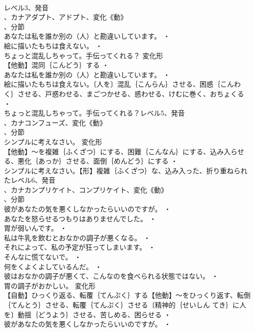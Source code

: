 \documentclass[8pt]{extreport}
\begin{document}
\begin{CJK}{UTF8}{min}
\\	レベル3、発音
\\	、カナアダプト、アドプト、変化《動》
\\	、分節
\\	あなたは私を誰か別の（人）と勘違いしています。 ・
\\	絵に描いたもちは食えない。 ・
\\	ちょっと混乱しちゃって。手伝ってくれる？	変化形 
\\	【他動】混同｛こんどう｝する ・
\\	あなたは私を誰か別の（人）と勘違いしています。 ・
\\	絵に描いたもちは食えない。〔人を〕混乱｛こんらん｝させる、困惑｛こんわく｝させる、戸惑わせる、まごつかせる、惑わせる、けむに巻く、おちょくる ・
\\	ちょっと混乱しちゃって。手伝ってくれる？レベル5、発音
\\	、カナコンフューズ、変化《動》
\\	、分節
\\	シンプルに考えなさい。	変化形 
\\	【他動】～を複雑｛ふくざつ｝にする、困難｛こんなん｝にする、込み入らせる、悪化｛あっか｝させる、面倒｛めんどう｝にする ・
\\	シンプルに考えなさい。【形】複雑｛ふくざつ｝な、込み入った、折り重ねられたレベル6、発音
\\	、カナカンプリケイト、コンプリケイト、変化《動》
\\	、分節
\\	彼があなたの気を悪くしなかったらいいのですが。 ・
\\	あなたを怒らせるつもりはありませんでした。 ・
\\	胃が弱いんです。 ・
\\	私は牛乳を飲むとおなかの調子が悪くなる。 ・
\\	それによって、私の予定が狂ってしまいます。 ・
\\	そんなに慌てないで。 ・
\\	何をくよくよしているんだ。 ・
\\	彼はおなかの調子が悪くて、こんなのを食べられる状態ではない。 ・
\\	胃の調子がおかしい。	変化形 
\\	【自動】ひっくり返る、転覆｛てんぷく｝する【他動】～をひっくり返す、転倒｛てんとう｝させる、転覆｛てんぷく｝させる〔精神的｛せいしん てき｝に人を〕動揺｛どうよう｝させる、苦しめる、困らせる ・
\\	彼があなたの気を悪くしなかったらいいのですが。 ・

\end{CJK}
\end{document}
